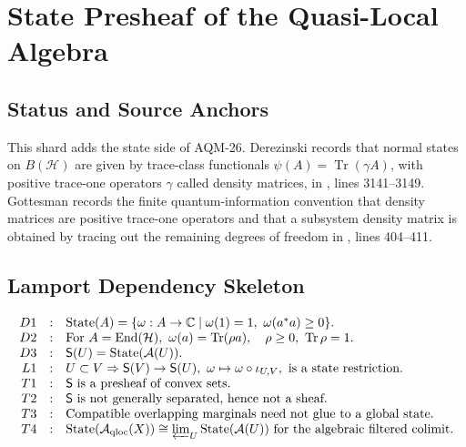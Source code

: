 
\section{State Presheaf of the Quasi-Local Algebra}
\label{sec:state-presheaf-quasilocal-algebra}

\subsection{Status and Source Anchors}

This shard adds the state side of AQM-26.  Derezinski records that normal
states on \(B(\mathcal H)\) are given by trace-class functionals
\(\psi(A)=\operatorname{Tr}(\gamma A)\), with positive trace-one operators
\(\gamma\) called density matrices, in
,
lines 3141--3149.  Gottesman records the finite quantum-information
convention that density matrices are positive trace-one operators and that a
subsystem density matrix is obtained by tracing out the remaining degrees of
freedom in
,
lines 404--411.

\subsection{Lamport Dependency Skeleton}

\[
\begin{array}{rcl}
D1&:&\operatorname{State}(A)=
      \{\omega:A\to\mathbb C\mid \omega(1)=1,\
      \omega(a^*a)\geq0\}.\\
D2&:&\text{For }A=\operatorname{End}(\mathcal H),\
      \omega(a)=\operatorname{Tr}(\rho a),\quad
      \rho\geq0,\ \operatorname{Tr}\rho=1.\\
D3&:&\mathsf S(U)=\operatorname{State}(\mathcal A(U)).\\
L1&:&U\subset V\Rightarrow
      \mathsf S(V)\to\mathsf S(U),\ \omega\mapsto
      \omega\circ\iota_{U,V},\text{ is a state restriction.}\\
T1&:&\mathsf S\text{ is a presheaf of convex sets.}\\
T2&:&\mathsf S\text{ is not generally separated, hence not a sheaf.}\\
T3&:&\text{Compatible overlapping marginals need not glue to a global state.}\\
T4&:&\operatorname{State}(\mathcal A_{\rm qloc}(X))
      \cong\varprojlim_U\operatorname{State}(\mathcal A(U))
      \text{ for the algebraic filtered colimit.}
\end{array}
\]

